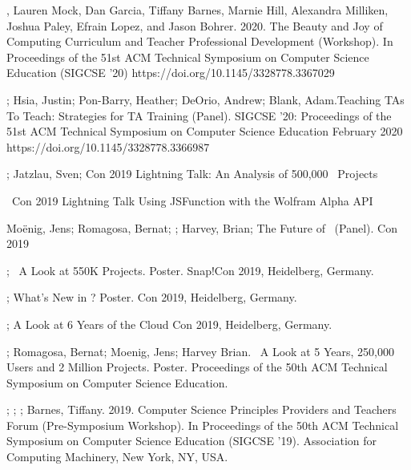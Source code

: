 \begin{etaremune}
    \item{\me, Lauren Mock, Dan Garcia, Tiffany Barnes, Marnie Hill, Alexandra Milliken, Joshua Paley, Efrain Lopez, and Jason Bohrer. 2020. The Beauty and Joy of Computing Curriculum and Teacher Professional Development (Workshop). In Proceedings of the 51st ACM Technical Symposium on Computer Science Education (SIGCSE '20)
    \newline
    https://doi.org/10.1145/3328778.3367029}
    
    \item{\me; Hsia, Justin; Pon-Barry, Heather; DeOrio, Andrew; Blank, Adam.Teaching TAs To Teach: Strategies for TA Training (Panel). SIGCSE '20: Proceedings of the 51st ACM Technical Symposium on Computer Science Education February 2020
    \newline
    https://doi.org/10.1145/3328778.3366987}

    
    \item{\me; Jatzlau, Sven; \snap{}Con 2019 Lightning Talk: An Analysis of 500,000 \snap\ Projects}
    
    \item{\me\ \snap Con 2019 Lightning Talk Using JSFunction with the Wolfram Alpha API}
    
    \item{Moënig, Jens; Romagosa, Bernat; \me; Harvey, Brian; The Future of \snap\ (Panel). \snap Con 2019}
    
    
    \item{\me; \snap\ A Look at 550K Projects. Poster. Snap!Con 2019, Heidelberg, Germany.}
    
    \item{\me; What's New in ? Poster. \snap{}Con 2019, Heidelberg, Germany.}
    
    \item{\me; A Look at 6 Years of the \snap{}Cloud \snap{}Con 2019, Heidelberg, Germany.}
    
    
    \item{\me; Romagosa, Bernat; Moenig, Jens; Harvey Brian. \snap\ A Look at 5 Years, 250,000 Users and 2 Million Projects. Poster. Proceedings of the 50th ACM Technical Symposium on Computer Science Education.}
    
    \item{\lauren; \me; \dan; Barnes, Tiffany. 2019. Computer Science Principles Providers and Teachers Forum (Pre-Symposium Workshop). In Proceedings of the 50th ACM Technical Symposium on Computer Science Education (SIGCSE '19). Association for Computing Machinery, New York, NY, USA.}
    

\end{etaremune}
